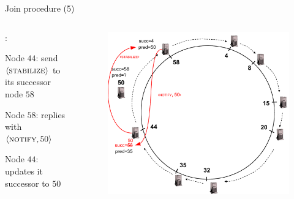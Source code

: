 \begin{frame}{Join procedure (5)}

\begin{columns}
\begin{column}{0.4\textwidth}
:
\BI
\item Node $44$: send $\langle \textsc{stabilize} \rangle$ to its successor node $58$ 
\item Node $58$: replies with  $\langle \textsc{notify}, 50 \rangle$ 
\item Node $44$: updates it successor to $50$
\EI

\end{column}
\begin{column}{0.6\textwidth}
\begin{figure}
\includegraphics[width=1.0\textwidth]{figs/10/chord-example6}
\end{figure}
\end{column}
\end{columns}

\end{frame}


